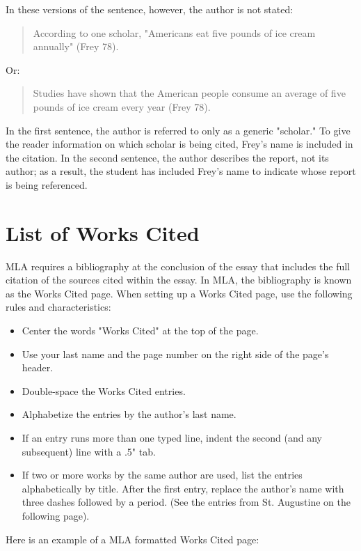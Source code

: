 In these versions of the sentence, however, the author is not stated:

\begin{quote}
According to one scholar, "Americans eat five pounds of ice cream annually" (Frey 78).
\end{quote}
Or:

\begin{quote}
Studies have shown that the American people consume an average of five pounds of ice 
cream every year (Frey 78).
\end{quote}
In the first sentence, the author is referred to only as a generic "scholar." To give the 
reader information on which scholar is being cited, Frey's name is included in the 
citation. In the second sentence, the author describes the report, not its author; as a 
result, the student has included Frey's name to indicate whose report is being referenced. 


\section{List of Works Cited}

MLA requires a bibliography at the conclusion of the essay that includes the full 
citation of the sources cited within the essay. In MLA, the bibliography is known as the 
Works Cited page. When setting up a Works Cited page, use the following rules and 
characteristics:

\begin{itemize}
\item Center the words "Works Cited" at the top of the page.
\item Use your last name and the page number on the right side of the page's header.
\item Double-space the Works Cited entries.
\item Alphabetize the entries by the author's last name.
\item If an entry runs more than one typed line, indent the second (and any 
subsequent) line with a .5" tab.
\item If two or more works by the same author are used, list the entries alphabetically 
by title. After the first entry, replace the author's name with three dashes followed by a 
period. (See the entries from St. Augustine on the following page).
\end{itemize}


Here is an example of a MLA formatted Works Cited page:

